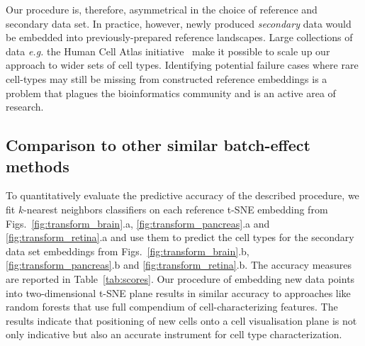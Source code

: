 \documentclass[runningheads]{llncs}
\begin{document}
Our procedure is, therefore, asymmetrical in the choice of reference and
secondary data set. In practice, however, newly produced {\em secondary} data
would be embedded into previously-prepared reference landscapes. Large
collections of data {\em e.g.} the Human Cell Atlas
initiative~\cite{Rozenblatt-Rosen2017} make it possible to scale up our approach
to wider sets of cell types. Identifying potential failure cases where rare
cell-types may still be missing from constructed reference embeddings is a
problem that plagues the bioinformatics community and is an active area of
research.


\subsection{Comparison to other similar batch-effect methods}

To quantitatively evaluate the predictive accuracy of the described procedure,
we fit $k$-nearest neighbors classifiers on each reference t-SNE embedding from
Figs.~\ref{fig:transform_brain}.a, \ref{fig:transform_pancreas}.a and
\ref{fig:transform_retina}.a and use them to predict the cell types for the
secondary data set embeddings from Figs.~\ref{fig:transform_brain}.b,
\ref{fig:transform_pancreas}.b and \ref{fig:transform_retina}.b. The accuracy
measures are reported in Table~\ref{tab:scores}. Our procedure of embedding new
data points into two-dimensional t-SNE plane results in similar accuracy to
approaches like random forests that use full compendium of cell-characterizing
features. The results indicate that positioning of new cells onto a cell
visualisation plane is not only indicative but also an accurate instrument for
cell type characterization.
\end{document}
